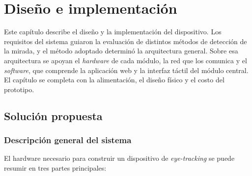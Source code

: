 
\chapter{Diseño e implementación} %

\label{Chapter3} %
\label{implementacion}
Este capítulo describe el diseño y la implementación del dispositivo. Los requisitos del sistema guiaron la evaluación de distintos métodos de detección de la mirada, y el método adoptado determinó la arquitectura general. Sobre esa arquitectura se apoyan el \emph{hardware} de cada módulo, la red que los comunica y el \emph{software}, que comprende la aplicación web y la interfaz táctil del módulo central. El capítulo se completa con la alimentación, el diseño físico y el costo del prototipo.

\iffalse
\section{Solución propuesta}

\subsection{Descripción general del sistema}

El hardware necesario para construir un dispositivo de \emph{eye-tracking} se puede resumir en tres partes principales:

